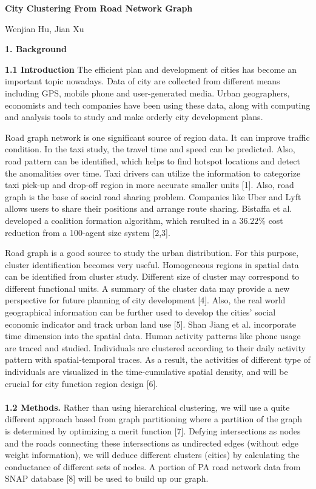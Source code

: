 \documentclass[12pt]{article}
\begin{document}
\begin{center}
{\LARGE \textbf{City Clustering From Road Network Graph}}
\end{center}
\begin{center}
Wenjian Hu, Jian Xu
\end{center}
\begin{center}
{\Large \textbf{1. Background}}
\end{center}
\textbf{1.1 Introduction} The efficient plan and development of cities has become an important topic nowadays. Data of city are collected from different means including GPS, mobile phone and user-generated media. Urban geographers, economists and tech companies have been using these data, along with computing and analysis tools to study and make orderly city development plans.
 
Road graph network is one significant source of region data. It can improve traffic condition. In the taxi study, the travel time and speed can be predicted. Also, road pattern can be identified, which helps to find hotspot locations and detect the anomalities over time. Taxi drivers can utilize the information to categorize taxi pick-up and drop-off region in more accurate smaller units [1]. Also, road graph is the base of social road sharing problem. Companies like Uber and Lyft allows users to share their positions and arrange route sharing. Bistaffa et al. developed a coalition formation algorithm, which resulted in a $36.22\%$ cost reduction from a 100-agent size system [2,3]. 
 
Road graph is a good source to study the urban distribution. For this purpose, cluster identification becomes very useful. Homogeneous regions in spatial data can be identified from cluster study. Different size of cluster may correspond to different functional units. A summary of the cluster data may provide a new perspective for future planning of city development [4]. Also, the real world geographical information can be further used to develop the cities’ social economic indicator and track urban land use [5]. Shan Jiang et al. incorporate time dimension into the spatial data. Human activity patterns like phone usage are traced and studied. Individuals are clustered according to their daily activity pattern with spatial-temporal traces. As a result, the activities of different type of individuals are visualized in the time-cumulative spatial density, and will be crucial for city function region design [6]. \\\\
\textbf{1.2 Methods.} Rather than using hierarchical clustering, we will use a quite different approach based from graph partitioning where a partition of the graph is determined by optimizing a merit function [7]. Defying intersections as nodes and the roads connecting these intersections as undirected edges (without edge weight information), we will deduce different clusters (cities) by calculating the conductance of different sets of nodes. A portion of PA road network data from SNAP database [8] will be used to build up our graph.
\end{document}
